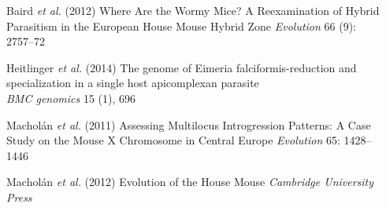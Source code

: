 \documentclass[30pt, a0paper, portrait, margin=0mm, innermargin=15mm,
               blockverticalspace=15mm, colspace=15mm, subcolspace=8mm]{tikzposter}
\begin{document}
\begin{columns}
{ 
}


      {
        \begin{small}
          
          \hangindent=2cm Baird \textit{et al.} (2012) Where Are the Wormy Mice? A Reexamination of Hybrid Parasitism in the European House Mouse Hybrid Zone \textit{Evolution} 66 (9): 2757--72
           
          \hangindent=2cm Heitlinger \textit{et al.} (2014) The genome of Eimeria falciformis-reduction and specialization in a single host apicomplexan parasite \\ \textit{BMC genomics} 15 (1), 696
          
          \hangindent=2cm Machol\'{a}n \textit{et al.} (2011) Assessing Multilocus Introgression Patterns: A Case Study on the Mouse X Chromosome in Central Europe \textit{Evolution} 65: 1428--1446

          \hangindent=2cm Machol\'{a}n \textit{et al.} (2012) Evolution of the House Mouse
          \textit{Cambridge University Press}
          
        
          
        \end{small}
      }

\end{columns}

\end{document}
